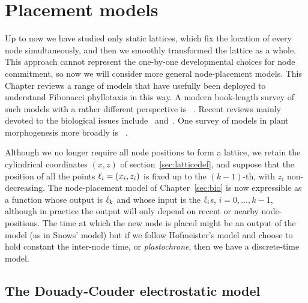 
 
\chapter{Placement models}
\label{ch:placement}
Up to now we have studied only static lattices, which fix the location of every node simultaneously, and then we smoothly transformed the lattice as a whole. This approach cannot represent the one-by-one developmental choices for node commitment, so now we will consider more general node-placement models. This Chapter reviews a range of models that have usefully been deployed to understand Fibonacci phyllotaxis in this way. A modern book-length survey of such models with a rather different perspective is ~\autocite{barabePhyllotacticPatternsMultidisciplinary2020}. Recent reviews mainly devoted to the biological issues include~\cite{traasPhyllotaxis2013} and~\cite{godinPhyllotaxisGeometricCanalization2020}. One survey of models in plant morphogenesis more broadly is  ~\autocite{prusinkiewiczComputationalModelsPlant2012}.

Although we no longer require all node positions to form a lattice, we retain the cylindrical coordinates $(x,z)$ of section~\ref{sec:latticedef}, and suppose that the position of all the points $\ell_{{i}} = (x_i,z_i)$ is fixed up to the $(k-1)$-th, with $z_i$ non-decreasing. The node-placement model of Chapter~\ref{sec:bio} is now expressible as a function whose output is $\ell_{{k}}$ and whose input is the $\ell_{{i}}$s, $i=0,\ldots, k-1$,
although in practice the output will only depend on recent or nearby node-positions. The time at which the new node is placed might be an output of the model (as in Snows' model) but if we follow Hofmeister's model and choose to hold constant the inter-node time, or \textit{plastochrone},  then we have a discrete-time model. 


\section{The Douady-Couder electrostatic model}
\label{sec:DouadyCouderModel}

